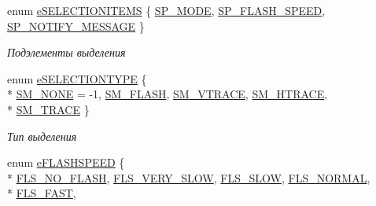 \begin{DoxyCompactItemize}
enum \hyperlink{namespacexyplot_aa9899923b471fe5ab609194e243a2b34}{e\-S\-E\-L\-E\-C\-T\-I\-O\-N\-I\-T\-E\-M\-S} \{ \hyperlink{namespacexyplot_aa9899923b471fe5ab609194e243a2b34aaa6ca447e56a383504a6581632700f0d}{S\-P\-\_\-\-M\-O\-D\-E}, 
\hyperlink{namespacexyplot_aa9899923b471fe5ab609194e243a2b34a2f1ff1328c08289f85318a53093edea3}{S\-P\-\_\-\-F\-L\-A\-S\-H\-\_\-\-S\-P\-E\-E\-D}, 
\hyperlink{namespacexyplot_aa9899923b471fe5ab609194e243a2b34af3eac694a09d9e96a7364552967c6bf6}{S\-P\-\_\-\-N\-O\-T\-I\-F\-Y\-\_\-\-M\-E\-S\-S\-A\-G\-E}
 \}
\begin{DoxyCompactList}\small\item\em Подэлементы выделения \end{DoxyCompactList}\item 
enum \hyperlink{namespacexyplot_ab18ef459ebd55a9281a5459dfce0a0fb}{e\-S\-E\-L\-E\-C\-T\-I\-O\-N\-T\-Y\-P\-E} \{ \\*
\hyperlink{namespacexyplot_ab18ef459ebd55a9281a5459dfce0a0fbacc3590f56480fef9648e0415202fb80f}{S\-M\-\_\-\-N\-O\-N\-E} = -\/1, 
\hyperlink{namespacexyplot_ab18ef459ebd55a9281a5459dfce0a0fbac3b7cf576289fefc839f0ab4dabe5f88}{S\-M\-\_\-\-F\-L\-A\-S\-H}, 
\hyperlink{namespacexyplot_ab18ef459ebd55a9281a5459dfce0a0fba281317c3fc31e5188720801565746c65}{S\-M\-\_\-\-V\-T\-R\-A\-C\-E}, 
\hyperlink{namespacexyplot_ab18ef459ebd55a9281a5459dfce0a0fba7cc26c0264d13fd7df519e13d70ef2c8}{S\-M\-\_\-\-H\-T\-R\-A\-C\-E}, 
\\*
\hyperlink{namespacexyplot_ab18ef459ebd55a9281a5459dfce0a0fbac7dcef6852b6e0529d4afebee3b30ccc}{S\-M\-\_\-\-T\-R\-A\-C\-E}
 \}
\begin{DoxyCompactList}\small\item\em Тип выделения \end{DoxyCompactList}\item 
enum \hyperlink{namespacexyplot_a1bac9f7a6de6b692c81e81ca9610190a}{e\-F\-L\-A\-S\-H\-S\-P\-E\-E\-D} \{ \\*
\hyperlink{namespacexyplot_a1bac9f7a6de6b692c81e81ca9610190aadd388bde41f9c3d8a30a3b94e3aa5db5}{F\-L\-S\-\_\-\-N\-O\-\_\-\-F\-L\-A\-S\-H}, 
\hyperlink{namespacexyplot_a1bac9f7a6de6b692c81e81ca9610190aa55da24413f65c7df4ece0966310f58d3}{F\-L\-S\-\_\-\-V\-E\-R\-Y\-\_\-\-S\-L\-O\-W}, 
\hyperlink{namespacexyplot_a1bac9f7a6de6b692c81e81ca9610190aaad74faeaff8f6cee91701b0598b2e1c4}{F\-L\-S\-\_\-\-S\-L\-O\-W}, 
\hyperlink{namespacexyplot_a1bac9f7a6de6b692c81e81ca9610190aaa577f5e912bcbcb39afea60326044685}{F\-L\-S\-\_\-\-N\-O\-R\-M\-A\-L}, 
\\*
\hyperlink{namespacexyplot_a1bac9f7a6de6b692c81e81ca9610190aa61e69ca66fce1c44f4808e3cd5d67aae}{F\-L\-S\-\_\-\-F\-A\-S\-T}, 

\end{DoxyCompactItemize}
